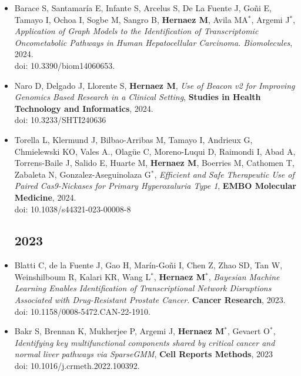 \documentclass[11pt,a4paper,sans]{moderncv}        %
\begin{document}
\begin{itemize}
\item Barace S, Santamaría E, Infante S, Arcelus S, De La Fuente J, Goñi E, Tamayo I, Ochoa I, Sogbe M, Sangro B, \textbf{Hernaez M}, Avila MA$^{\ast}$, Argemi J$^{\ast}$, \textsl{Application of Graph Models to the Identification of Transcriptomic Oncometabolic Pathways in Human Hepatocellular Carcinoma. Biomolecules}, 2024. \\
doi: 10.3390/biom14060653. \\

\item Naro D, Delgado J, Llorente S, \textbf{Hernaez M}, \textsl{Use of Beacon v2 for Improving Genomics Based Research in a Clinical Setting}, \textbf{Studies in Health Technology and Informatics}, 2024.\\
doi: 10.3233/SHTI240636\\

\item Torella L, Klermund J, Bilbao-Arribas M, Tamayo I, Andrieux G, Chmielewski KO, Vales A., Olagüe C, Moreno-Luqui D, Raimondi I, Abad A, Torrens-Baile J, Salido E, Huarte M, \textbf{Hernaez M}, Boerries M, Cathomen T, Zabaleta N, Gonzalez-Aseguinolaza G$^{\ast}$, \textsl{Efficient and Safe Therapeutic Use of Paired Cas9-Nickases for Primary Hyperoxaluria Type 1},  \textbf{EMBO Molecular Medicine}, 2024.\\
doi: 10.1038/s44321-023-00008-8\\

\subsection{2023}
\vspace{6pt}

\item Blatti C, de la Fuente J, Gao H, Marín-Goñi I, Chen Z, Zhao SD, Tan W, Weinshilboum R, Kalari KR, Wang L$^{\ast}$, \textbf{Hernaez M}$^{\ast}$, \textsl{Bayesian Machine Learning Enables Identification of Transcriptional Network Disruptions Associated with Drug-Resistant Prostate Cancer}. \textbf{Cancer Research}, 2023.\\
doi: 10.1158/0008-5472.CAN-22-1910.\\

\item Bakr S, Brennan K, Mukherjee P, Argemi J, \textbf{Hernaez M}$^{\ast}$, Gevaert O$^{\ast}$, \textsl{Identifying key multifunctional components shared by critical cancer and normal liver pathways via SparseGMM}, \textbf{Cell Reports Methods}, 2023\\
doi: 10.1016/j.crmeth.2022.100392.\\


\end{itemize}
\end{document}
